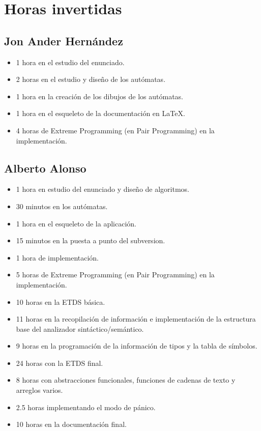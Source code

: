 
\chapter{Horas invertidas}

    \section{Jon Ander Hernández}
    
        \begin{itemize}
            \item 1 hora en el estudio del enunciado.
            \item 2 horas en el estudio y diseño de los autómatas.
            \item 1 hora en la creación de los dibujos de los autómatas.
            \item 1 hora en el esqueleto de la documentación en \LaTeX.
            \item 4 horas de Extreme Programming (en Pair Programming) en la implementación.
         \end{itemize}
    
    \section{Alberto Alonso}
    
        \begin{itemize}
            \item 1 hora en estudio del enunciado y diseño de algoritmos.
            \item 30 minutos en los autómatas.
            \item 1 hora en el esqueleto de la aplicación.
            \item 15 minutos en la puesta a punto del subversion.
            \item 1 hora de implementación.
            \item 5 horas de Extreme Programming (en Pair Programming) en la implementación.
			\item 10 horas en la ETDS básica.
			\item 11 horas en la recopilación de información e implementación de la estructura base del analizador sintáctico/semántico.
			\item 9 horas en la programación de la información de tipos y la tabla de símbolos.
			\item 24 horas con la ETDS final.
			\item 8 horas con abstracciones funcionales, funciones de cadenas de texto y arreglos varios.
			\item 2.5 horas implementando el modo de pánico.
			\item 10 horas en la documentación final.
        \end{itemize}
    
